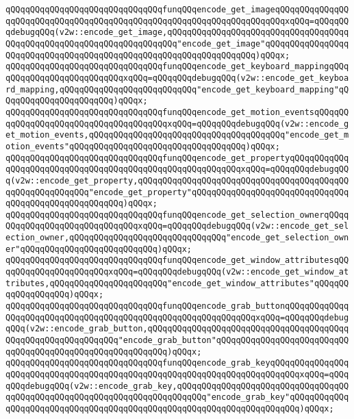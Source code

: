 \verb|qQQqqQQqqQQqqQQqqQQqqQQqqQQqqQQqfunqQQqencode_get_imageqQQqqQQqqQQqqQQqqQQqqQQqqQQqqQQqqQQqqQQqqQQqqQQqqQQqqQQqqQQqqQQqqQQqqQQqxqQQq=qQQqqQQqdebugqQQq(v2w::encode_get_image,qQQqqQQqqQQqqQQqqQQqqQQqqQQqqQQqqQQqqQQqqQQqqQQqqQQqqQQqqQQqqQQqqQQqqQQq"encode_get_image"qQQqqQQqqQQqqQQqqQQqqQQqqQQqqQQqqQQqqQQqqQQqqQQqqQQqqQQqqQQqqQQqqQQq)qQQqx;|\newline
\verb|qQQqqQQqqQQqqQQqqQQqqQQqqQQqqQQqfunqQQqencode_get_keyboard_mappingqQQqqQQqqQQqqQQqqQQqqQQqqQQqxqQQq=qQQqqQQqdebugqQQq(v2w::encode_get_keyboard_mapping,qQQqqQQqqQQqqQQqqQQqqQQqqQQq"encode_get_keyboard_mapping"qQQqqQQqqQQqqQQqqQQqqQQq)qQQqx;|\newline
\verb|qQQqqQQqqQQqqQQqqQQqqQQqqQQqqQQqfunqQQqencode_get_motion_eventsqQQqqQQqqQQqqQQqqQQqqQQqqQQqqQQqqQQqqQQqxqQQq=qQQqqQQqdebugqQQq(v2w::encode_get_motion_events,qQQqqQQqqQQqqQQqqQQqqQQqqQQqqQQqqQQqqQQq"encode_get_motion_events"qQQqqQQqqQQqqQQqqQQqqQQqqQQqqQQqqQQq)qQQqx;|\newline
\verb|qQQqqQQqqQQqqQQqqQQqqQQqqQQqqQQqfunqQQqencode_get_propertyqQQqqQQqqQQqqQQqqQQqqQQqqQQqqQQqqQQqqQQqqQQqqQQqqQQqqQQqqQQqxqQQq=qQQqqQQqdebugqQQq(v2w::encode_get_property,qQQqqQQqqQQqqQQqqQQqqQQqqQQqqQQqqQQqqQQqqQQqqQQqqQQqqQQqqQQq"encode_get_property"qQQqqQQqqQQqqQQqqQQqqQQqqQQqqQQqqQQqqQQqqQQqqQQqqQQqqQQq)qQQqx;|\newline
\verb|qQQqqQQqqQQqqQQqqQQqqQQqqQQqqQQqfunqQQqencode_get_selection_ownerqQQqqQQqqQQqqQQqqQQqqQQqqQQqqQQqxqQQq=qQQqqQQqdebugqQQq(v2w::encode_get_selection_owner,qQQqqQQqqQQqqQQqqQQqqQQqqQQqqQQq"encode_get_selection_owner"qQQqqQQqqQQqqQQqqQQqqQQqqQQq)qQQqx;|\newline
\verb|qQQqqQQqqQQqqQQqqQQqqQQqqQQqqQQqfunqQQqencode_get_window_attributesqQQqqQQqqQQqqQQqqQQqqQQqxqQQq=qQQqqQQqdebugqQQq(v2w::encode_get_window_attributes,qQQqqQQqqQQqqQQqqQQqqQQq"encode_get_window_attributes"qQQqqQQqqQQqqQQqqQQq)qQQqx;|\newline
\verb|qQQqqQQqqQQqqQQqqQQqqQQqqQQqqQQqfunqQQqencode_grab_buttonqQQqqQQqqQQqqQQqqQQqqQQqqQQqqQQqqQQqqQQqqQQqqQQqqQQqqQQqqQQqqQQqxqQQq=qQQqqQQqdebugqQQq(v2w::encode_grab_button,qQQqqQQqqQQqqQQqqQQqqQQqqQQqqQQqqQQqqQQqqQQqqQQqqQQqqQQqqQQqqQQq"encode_grab_button"qQQqqQQqqQQqqQQqqQQqqQQqqQQqqQQqqQQqqQQqqQQqqQQqqQQqqQQqqQQq)qQQqx;|\newline
\verb|qQQqqQQqqQQqqQQqqQQqqQQqqQQqqQQqfunqQQqencode_grab_keyqQQqqQQqqQQqqQQqqQQqqQQqqQQqqQQqqQQqqQQqqQQqqQQqqQQqqQQqqQQqqQQqqQQqqQQqqQQqxqQQq=qQQqqQQqdebugqQQq(v2w::encode_grab_key,qQQqqQQqqQQqqQQqqQQqqQQqqQQqqQQqqQQqqQQqqQQqqQQqqQQqqQQqqQQqqQQqqQQqqQQqqQQq"encode_grab_key"qQQqqQQqqQQqqQQqqQQqqQQqqQQqqQQqqQQqqQQqqQQqqQQqqQQqqQQqqQQqqQQqqQQqqQQq)qQQqx;|\newline

